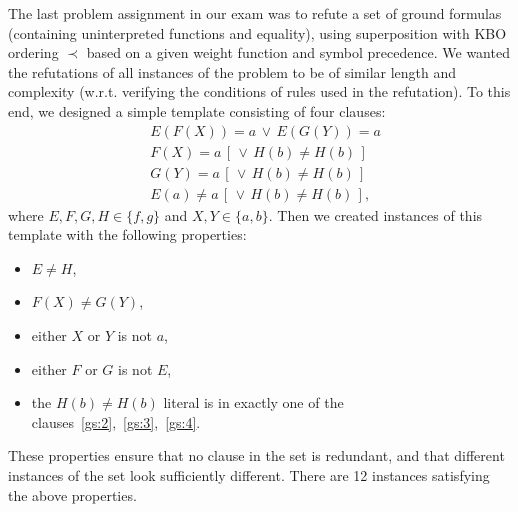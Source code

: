 The last problem assignment in our exam was to refute a set of ground formulas
(containing uninterpreted functions and equality),
using superposition with KBO ordering $\prec$ based on
a given weight function and symbol precedence.
We wanted the refutations of all instances of the problem to be
of similar length and complexity (w.r.t. verifying the conditions
of rules used in the refutation). To this end, we designed a simple
template consisting of four clauses:
\begin{align}
  &E(F(X)) = a \,\lor\, E(G(Y)) = a \label{gs:1} \\
  &F(X) = a \,[\, \lor\, H(b) \not= H(b) \,] \label{gs:2} \\
  &G(Y) = a \,[\, \lor\, H(b) \not= H(b) \,] \label{gs:3} \\
  &E(a) \not= a \,[\, \lor\, H(b) \not= H(b) \,] \label{gs:4},
\end{align}
where $E, F, G, H \in \{f, g\}$ and $X, Y \in \{a, b\}$.
%
Then we created
instances of this template with the following properties:
\begin{itemize}
  \item $E \not = H$,
  \item $F(X) \not = G(Y)$,
  \item either $X$ or $Y$ is not $a$,
  \item either $F$ or $G$ is not $E$,
  \item the $H(b) \not = H(b)$ literal is in exactly one of the
    clauses~\eqref{gs:2},~\eqref{gs:3},~\eqref{gs:4}.
\end{itemize}
These properties ensure that no clause in the set is redundant,
and that different instances of the set look sufficiently different.
There are 12 instances satisfying the above properties.
%

